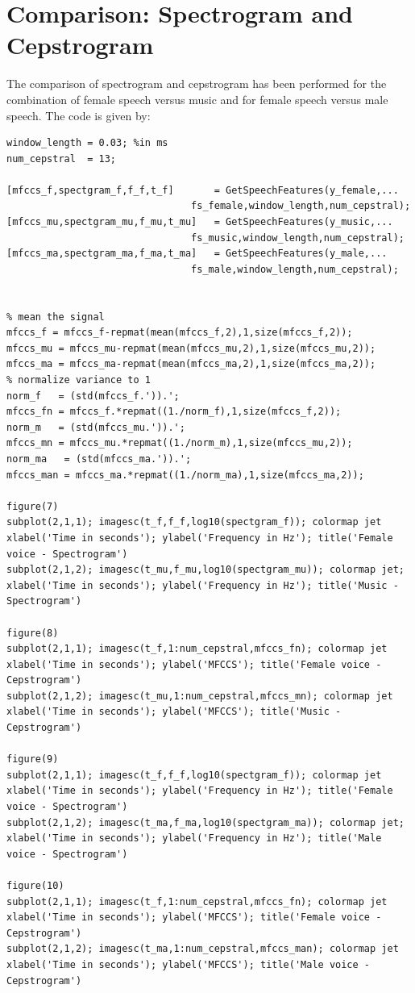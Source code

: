 \section{Comparison: Spectrogram and Cepstrogram}
The comparison of spectrogram and cepstrogram has been performed for the combination of female speech versus music and for female speech versus male speech. The code is given by:
\begin{lstlisting}
window_length = 0.03; %in ms
num_cepstral  = 13;

[mfccs_f,spectgram_f,f_f,t_f]       = GetSpeechFeatures(y_female,...
                                fs_female,window_length,num_cepstral);
[mfccs_mu,spectgram_mu,f_mu,t_mu]   = GetSpeechFeatures(y_music,...
                                fs_music,window_length,num_cepstral);
[mfccs_ma,spectgram_ma,f_ma,t_ma]   = GetSpeechFeatures(y_male,...
                                fs_male,window_length,num_cepstral);


% mean the signal
mfccs_f = mfccs_f-repmat(mean(mfccs_f,2),1,size(mfccs_f,2));
mfccs_mu = mfccs_mu-repmat(mean(mfccs_mu,2),1,size(mfccs_mu,2));
mfccs_ma = mfccs_ma-repmat(mean(mfccs_ma,2),1,size(mfccs_ma,2));
% normalize variance to 1
norm_f   = (std(mfccs_f.')).';
mfccs_fn = mfccs_f.*repmat((1./norm_f),1,size(mfccs_f,2));
norm_m   = (std(mfccs_mu.')).';
mfccs_mn = mfccs_mu.*repmat((1./norm_m),1,size(mfccs_mu,2));
norm_ma   = (std(mfccs_ma.')).';
mfccs_man = mfccs_ma.*repmat((1./norm_ma),1,size(mfccs_ma,2));

figure(7)
subplot(2,1,1); imagesc(t_f,f_f,log10(spectgram_f)); colormap jet
xlabel('Time in seconds'); ylabel('Frequency in Hz'); title('Female voice - Spectrogram')
subplot(2,1,2); imagesc(t_mu,f_mu,log10(spectgram_mu)); colormap jet;
xlabel('Time in seconds'); ylabel('Frequency in Hz'); title('Music - Spectrogram')

figure(8)
subplot(2,1,1); imagesc(t_f,1:num_cepstral,mfccs_fn); colormap jet
xlabel('Time in seconds'); ylabel('MFCCS'); title('Female voice - Cepstrogram')
subplot(2,1,2); imagesc(t_mu,1:num_cepstral,mfccs_mn); colormap jet
xlabel('Time in seconds'); ylabel('MFCCS'); title('Music - Cepstrogram')

figure(9)
subplot(2,1,1); imagesc(t_f,f_f,log10(spectgram_f)); colormap jet
xlabel('Time in seconds'); ylabel('Frequency in Hz'); title('Female voice - Spectrogram')
subplot(2,1,2); imagesc(t_ma,f_ma,log10(spectgram_ma)); colormap jet;
xlabel('Time in seconds'); ylabel('Frequency in Hz'); title('Male voice - Spectrogram')

figure(10)
subplot(2,1,1); imagesc(t_f,1:num_cepstral,mfccs_fn); colormap jet
xlabel('Time in seconds'); ylabel('MFCCS'); title('Female voice - Cepstrogram')
subplot(2,1,2); imagesc(t_ma,1:num_cepstral,mfccs_man); colormap jet
xlabel('Time in seconds'); ylabel('MFCCS'); title('Male voice - Cepstrogram')
\end{lstlisting}

